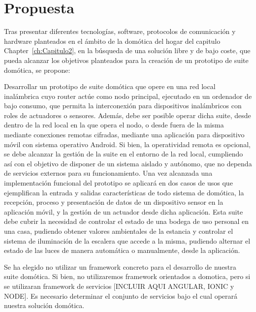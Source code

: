 \cleardoublepage

\chapter{Propuesta}
\label{ch:Capitulo3}

Tras presentar diferentes tecnologías, software, protocolos de comunicación y hardware planteados en el ámbito de la domótica del hogar del capitulo Chapter~\ref{ch:Capitulo2}, en la búsqueda de una solución libre y de bajo coste, que pueda alcanzar los objetivos planteados para la creación de un prototipo de suite domótica, se propone:

\vspace{1cm}

Desarrollar un prototipo de suite domótica que opere en una red local inalámbrica cuyo router actúe como nodo principal, ejecutado en un ordenador de bajo consumo, que permita la interconexión para dispositivos inalámbricos con roles de actuadores o sensores. Además, debe ser posible operar dicha suite, desde dentro de la red local en la que opera el nodo, o desde fuera de la misma mediante conexiones remotas cifradas, mediante una aplicación para dispositivo móvil con sistema operativo Android. Si bien, la operatividad remota es opcional, se debe alcanzar la gestión de la suite en el entorno de la red local, cumpliendo así con el objetivo de disponer de un sistema aislado y autónomo, que no dependa de servicios externos para su funcionamiento. Una vez alcanzada una implementación funcional del prototipo se aplicará en dos casos de usos que ejemplifican la entrada y salidas características de todo sistema de domótica, la recepción, proceso y presentación de datos de un dispositivo sensor en la aplicación móvil, y la gestión de un actuador desde dicha aplicación. Esta suite debe cubrir la necesidad de controlar el estado de una bodega de uso personal en una casa, pudiendo obtener valores ambientales de la estancia y controlar el sistema de iluminación de la escalera que accede a la misma, pudiendo alternar el estado de las luces de manera automática o manualmente, desde la aplicación.


Se ha elegido no utilizar un \gls{framework} concreto para el desarrollo de nuestra suite domótica. Si bien, no utilizaremos \gls{framework} orientados a domotica, pero si se utilizaran \gls{framework} de servicios [INCLUIR AQUI ANGULAR, IONIC y NODE]. Es necesario determinar el conjunto de servicios bajo el cual operará nuestra solución domótica.


